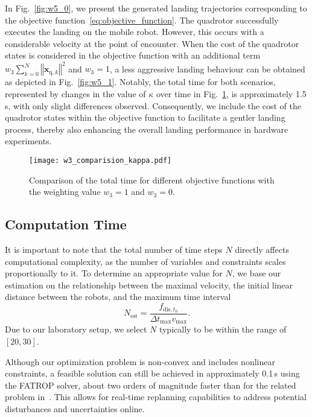 \documentclass[conference,preprint]{IEEEtran}
\begin{document}
In Fig.~\ref{fig:w5_0}, we present the generated landing trajectories corresponding to the objective function~\eqref{eq:objective_function}. The quadrotor successfully executes the landing on the mobile robot. However, this occurs with a considerable velocity at the point of encounter. When the cost of the quadrotor states is considered in the objective function with an additional term $w_3\sum_{k=0}^N \left\Vert \bm{x}_{\text{q},k}\right\Vert^2$ and $w_3=1$, a less aggressive landing behaviour can be obtained as depicted in Fig.~\ref{fig:w5_1}.
Notably, the total time for both scenarios, represented by changes in the value of $\kappa$ over time in Fig.~\ref{fig:total_time_comparision}, is approximately 1.5\,s, with only slight differences observed.
Consequently, we include the cost of the quadrotor states within the objective function to facilitate a gentler landing process, thereby also enhancing the overall landing performance in hardware experiments.

\begin{figure}
  \centering
  \texttt{[image: w3\_comparision\_kappa.pdf]}
  \caption{Comparison of the total time for different objective functions with the weighting value $w_3=1$ and $w_3=0$.}
  \label{fig:total_time_comparision}
\end{figure}    


\subsection{Computation Time}
\label{sec:computation_time}
It is important to note that the total number of time steps $N$ directly affects computational complexity, as the number of variables and constraints scales proportionally to it. To determine an appropriate value for $N$, we base our estimation on the relationship between the maximal velocity, the initial linear distance between the robots, and the maximum time interval
$$N_\text{est}= \frac{f_{\text{dis},t_0}}{\Delta t_\text{max}v_\text{max}}.$$ 
Due to our laboratory setup, we select $N$ typically to be within the range of $[20,30]$. 

Although our optimization problem is non-convex and includes nonlinear constraints, a feasible solution can still be achieved in approximately 0.1\,s using the \textsc{FATROP} solver, about two orders of magnitude faster than for the related problem in~\cite{Luo2023}. 
This allows for real-time replanning capabilities to address potential disturbances and uncertainties online. 
\end{document}
